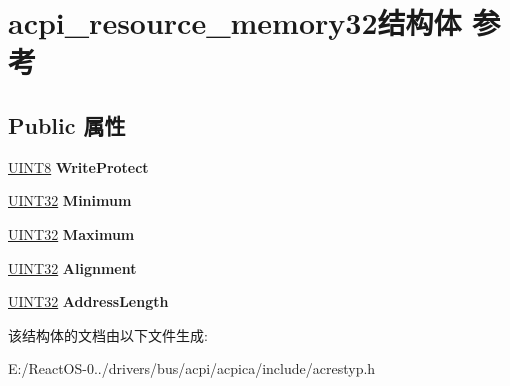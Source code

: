 \hypertarget{structacpi__resource__memory32}{}\section{acpi\+\_\+resource\+\_\+memory32结构体 参考}
\label{structacpi__resource__memory32}
\subsection*{Public 属性}
\begin{DoxyCompactItemize}
\item 
\mbox{\label{structacpi__resource__memory32_ab5cfc6cad0dbedccadea0c19bdde474a}} 
\hyperlink{_processor_bind_8h_ab27e9918b538ce9d8ca692479b375b6a}{U\+I\+N\+T8} {\bfseries Write\+Protect}
\item 
\mbox{\label{structacpi__resource__memory32_a07d1b214702ddcb8a6925ce385e1ac7b}} 
\hyperlink{_processor_bind_8h_ae1e6edbbc26d6fbc71a90190d0266018}{U\+I\+N\+T32} {\bfseries Minimum}
\item 
\mbox{\label{structacpi__resource__memory32_a39634bfe30782c761de59a74c3c5ead7}} 
\hyperlink{_processor_bind_8h_ae1e6edbbc26d6fbc71a90190d0266018}{U\+I\+N\+T32} {\bfseries Maximum}
\item 
\mbox{\label{structacpi__resource__memory32_a4caad2ccff307bdcbfb345ead2b8d575}} 
\hyperlink{_processor_bind_8h_ae1e6edbbc26d6fbc71a90190d0266018}{U\+I\+N\+T32} {\bfseries Alignment}
\item 
\mbox{\label{structacpi__resource__memory32_aad4ce3e43f78e766c07e8d980129619d}} 
\hyperlink{_processor_bind_8h_ae1e6edbbc26d6fbc71a90190d0266018}{U\+I\+N\+T32} {\bfseries Address\+Length}
\end{DoxyCompactItemize}


该结构体的文档由以下文件生成\+:\begin{DoxyCompactItemize}
\item 
E\+:/\+React\+O\+S-\/0../drivers/bus/acpi/acpica/include/acrestyp.\+h\end{DoxyCompactItemize}
